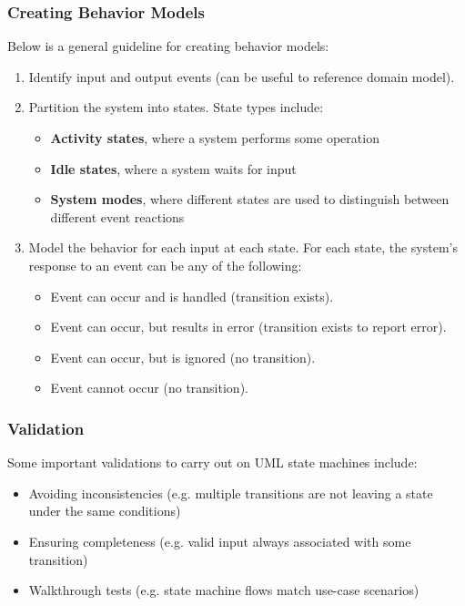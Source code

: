 \documentclass[12pt,titlepage]{article}
\begin{document}
      \subsubsection{Creating Behavior Models}
        Below is a general guideline for creating behavior models:
        \begin{enumerate}
          \item Identify input and output events (can be useful to reference domain model).
          \item Partition the system into states. State types include:
            \begin{itemize}
              \item \textbf{Activity states}, where a system performs some operation
              \item \textbf{Idle states}, where a system waits for input
              \item \textbf{System modes}, where different states are used to distinguish between different event reactions
            \end{itemize}
          \item Model the behavior for each input at each state. For each state, the system's response to an event can be any of the following:
            \begin{itemize}
              \item Event can occur and is handled (transition exists).
              \item Event can occur, but results in error (transition exists to report error).
              \item Event can occur, but is ignored (no transition).
              \item Event cannot occur (no transition).
            \end{itemize}
        \end{enumerate}

      \subsubsection{Validation}
        Some important validations to carry out on UML state machines include:
        \begin{itemize}
          \item Avoiding inconsistencies (e.g. multiple transitions are not leaving a state under the same conditions)
          \item Ensuring completeness (e.g. valid input always associated with some transition)
          \item Walkthrough tests (e.g. state machine flows match use-case scenarios)
        \end{itemize}
\end{document}
